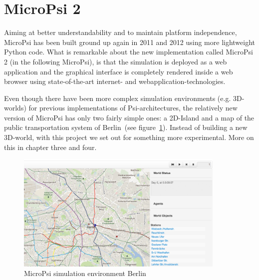     \section{MicroPsi 2}
Aiming at better understandability and to maintain platform independence, MicroPsi has been built ground up again in 2011 and 2012 using more lightweight Python code. What is remarkable about the new implementation called MicroPsi 2 (in the following MicroPsi), is that the simulation is deployed as a web application and the graphical interface is completely rendered inside a web browser using state-of-the-art internet- and webapplication-technologies.~\cite{conf/agi/Bach12}
        
Even though there have been more complex simulation environments (e.g. 3D-worlds) for previous implementations of Psi-architectures, the relatively new version of MicroPsi has only two fairly simple ones: a 2D-Island and a map of the public transportation system of Berlin~(see figure~\ref{mp2_berlin}). Instead of building a new 3D-world, with this project we set out for something more experimental. More on this in chapter three and four.

\begin{figure}[h]
  \centering
    \includegraphics[width=10cm]{graphics/mp2_berlin}
  \caption{MicroPsi simulation environment Berlin}
  \label{mp2_berlin}
\end{figure}

